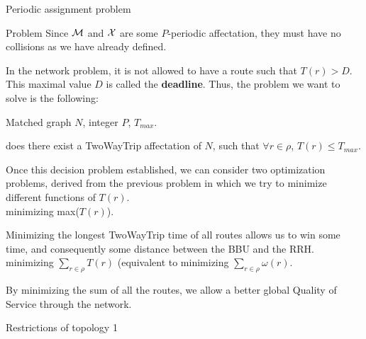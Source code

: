 \documentclass[a4paper,10pt]{report}
\begin{document}
\begin{chapter}{Periodic assignment problem}
\begin{section}{Problem}
Since ${\cal M}$ and ${\cal X}$ are some $P$-periodic affectation, they must have no collisions as we have already defined.



In the network problem, it is not allowed to have a route such that $T(r) > D$. This maximal value $D$ is called the {\bf deadline}.
Thus, the problem we want to solve is the following:\\


 Matched graph $N$, integer $P$, $ T_{max}$.

 does there exist a TwoWayTrip affectation of $N$, such that $\forall r \in \rho$, $T(r) \le T_{max}$.

Once this decision problem established, we can consider two optimization problems, derived from the previous problem in which
we try to minimize different functions of $T(r)$.\\

 minimizing max($T(r)$).

Minimizing the longest TwoWayTrip time of all routes allows us to win some time, and consequently some distance between the BBU and the RRH.\\

 minimizing $\sum_{r \in \rho}  T(r)$ (equivalent to minimizing $\sum_{r \in \rho}  \omega(r)$.

By minimizing the sum of all the routes, we allow a better global Quality of Service through the network.\\
\begin{subsection}{Restrictions of topology 1}
\label{topologiescases}
\end{subsection}
\end{section}
\end{chapter}
\end{document}
